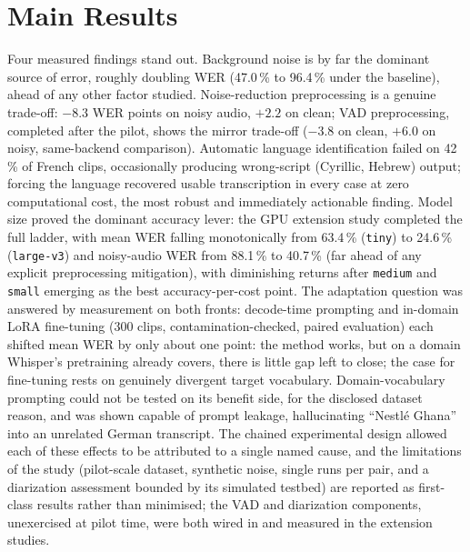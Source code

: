 \documentclass[12pt]{report}
\begin{document}
\section*{Main Results}
Four measured findings stand out. Background noise is by far the dominant source of error, roughly doubling WER (47.0\,\% to 96.4\,\% under the baseline), ahead of any other factor studied. Noise-reduction preprocessing is a genuine trade-off: $-8.3$ WER points on noisy audio, $+2.2$ on clean; VAD preprocessing, completed after the pilot, shows the mirror trade-off ($-3.8$ on clean, $+6.0$ on noisy, same-backend comparison). Automatic language identification failed on 42\,\% of French clips, occasionally producing wrong-script (Cyrillic, Hebrew) output; forcing the language recovered usable transcription in every case at zero computational cost, the most robust and immediately actionable finding. Model size proved the dominant accuracy lever: the GPU extension study completed the full ladder, with mean WER falling monotonically from 63.4\,\% (\texttt{tiny}) to 24.6\,\% (\texttt{large-v3}) and noisy-audio WER from 88.1\,\% to 40.7\,\% (far ahead of any explicit preprocessing mitigation), with diminishing returns after \texttt{medium} and \texttt{small} emerging as the best accuracy-per-cost point. The adaptation question was answered by measurement on both fronts: decode-time prompting and in-domain LoRA fine-tuning (300 clips, contamination-checked, paired evaluation) each shifted mean WER by only about one point: the method works, but on a domain Whisper's pretraining already covers, there is little gap left to close; the case for fine-tuning rests on genuinely divergent target vocabulary. Domain-vocabulary prompting could not be tested on its benefit side, for the disclosed dataset reason, and was shown capable of prompt leakage, hallucinating \enquote{Nestl\'e Ghana} into an unrelated German transcript. The chained experimental design allowed each of these effects to be attributed to a single named cause, and the limitations of the study (pilot-scale dataset, synthetic noise, single runs per pair, and a diarization assessment bounded by its simulated testbed) are reported as first-class results rather than minimised; the VAD and diarization components, unexercised at pilot time, were both wired in and measured in the extension studies.
\end{document}
